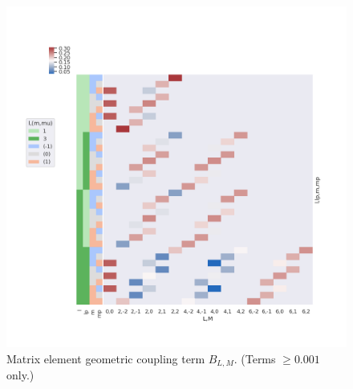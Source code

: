 \documentclass[10pt]{article}
\begin{document}
\begin{figure}[]
\begin{center}
\includegraphics[width=\textwidth,height=\dimexpr\textheight-4\baselineskip-\abovecaptionskip-\belowcaptionskip\relax,keepaspectratio]{figures/basisPlots_090822_BLMtable.png}
\caption{Matrix element geometric coupling term \(B_{L,M}\). (Terms \(\ge0.001\) only.)\label{776753}}
\end{center}
\end{figure}
\end{document}
